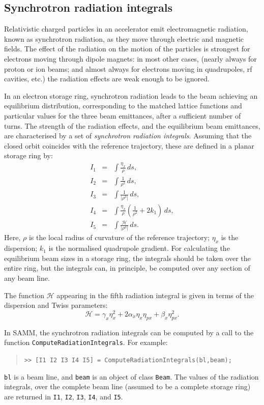 \documentclass[11pt,twoside,a4paper]{article}
\begin{document}
\subsection{Synchrotron radiation integrals}
Relativistic charged particles in an accelerator emit electromagnetic radiation,
known as synchrotron radiation, as they move through electric and magnetic
fields.  The effect of the radiation on the motion of the particles is
strongest for electrons moving through dipole magnets: in most other cases,
(nearly always for proton or ion beams; and almost always for electrons
moving in quadrupoles, rf cavities, etc.) the radiation effects are weak
enough to be ignored.

In an electron storage ring, synchrotron radiation leads to the beam
achieving an equilibrium distribution, corresponding to the matched lattice
functions and particular values for the three beam emittances, after
a sufficient number of turns.  The strength of the radiation effects,
and the equilibrium beam emittances, are characterised by a set of
\emph{synchrotron radiation integrals}.  Assuming that the closed orbit
coincides with the reference trajectory, these are defined in a planar
storage ring by:
\begin{eqnarray*}
I_1 & = & \int \frac{\eta_x}{\rho} \, ds, \\
I_2 & = & \int \frac{1}{\rho^2} \, ds, \\
I_3 & = & \int \frac{1}{\left| \rho^3 \right|} \, ds, \\
I_4 & = & \int \frac{\eta_x}{\rho} \left( \frac{1}{\rho^2} + 2k_1 \right) \, ds, \\
I_5 & = & \int \frac{\mathcal{H}}{\left| \rho^3 \right|} \, ds.
\end{eqnarray*}
Here, $\rho$ is the local radius of curvature of the reference trajectory;
$\eta_x$ is the dispersion; $k_1$ is the normalised quadrupole gradient.
For calculating the equilibrium beam sizes in a storage ring, the integrals
should be taken over the entire ring, but the integrals can, in principle, be
computed over any section of any beam line.

The function $\mathcal{H}$ appearing in the fifth radiation integral is
given in terms of the dispersion and Twiss parameters:
\[
\mathcal{H} = \gamma_x \eta_x^2 + 2 \alpha_x \eta_x \eta_{px} + \beta_x \eta_{px}^2.
\]

In SAMM, the synchrotron radiation integrals can be computed by a call
to the function \texttt{ComputeRadiationIntegrals}.  For example:
\begin{quote}
\texttt{>> [I1 I2 I3 I4 I5] = ComputeRadiationIntegrals(bl,beam);}
\end{quote}
\texttt{bl} is a beam line, and \texttt{beam} is an object of class \texttt{Beam}.  The
values of the radiation integrals, over the complete beam line (assumed to be
a complete storage ring) are returned in \texttt{I1}, \texttt{I2}, \texttt{I3},
\texttt{I4}, and \texttt{I5}.
\end{document}
